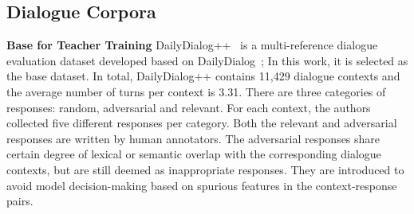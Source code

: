 \documentclass[letterpaper]{article} \usepackage{aaai22}  \usepackage{times}  \usepackage{helvet}  \usepackage{courier}  \usepackage[hyphens]{url}  \usepackage{graphicx} \urlstyle{rm} \def\UrlFont{\rm}  \usepackage{natbib}  \usepackage{caption} \DeclareCaptionStyle{ruled}{labelfont=normalfont,labelsep=colon,strut=off} \frenchspacing  \setlength{\pdfpagewidth}{8.5in}  \setlength{\pdfpageheight}{11in}  \usepackage{algorithm}
\begin{document}
\subsection{Dialogue Corpora}
\label{subsec:datasets}
\bigskip
\noindent\textbf{Base for Teacher Training}
DailyDialog++~\citep{sai-etal-2020-improving} is a multi-reference dialogue evaluation dataset developed based on DailyDialog~\citep{li-etal-2017-dailydialog}; In this work, it is selected as the base dataset. In total, DailyDialog++ contains 11,429 dialogue contexts and the average number of turns per context is 3.31. There are three categories of responses: random, adversarial and relevant. For each context, the authors collected five different responses per category. Both the relevant and adversarial responses are written by human annotators. The adversarial responses share certain degree of lexical or semantic overlap with the corresponding dialogue contexts, but are still deemed as inappropriate responses. They are introduced to avoid model decision-making based on spurious features in the context-response pairs.

\begin{table*}[!h]
\centering
{}
\caption{Human-Human Dialogue Corpora Statistics}\label{tab:data-statistics}
\end{table*}
\end{document}
